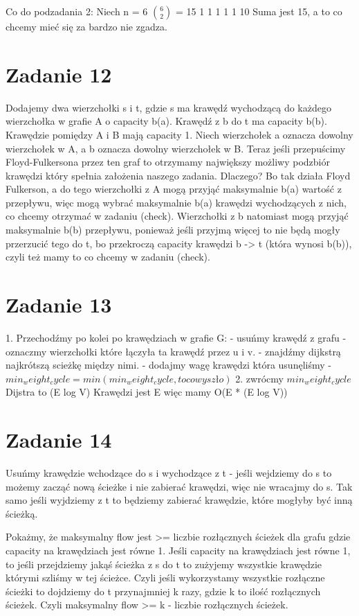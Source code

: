 \documentclass[12pt]{article}
\begin{document}
Co do podzadania 2:
Niech n = 6
$\binom{6}{2}$ = 15
1 1 1 1 1 10
Suma jest 15, a to co chcemy mieć się za bardzo nie zgadza.


\section{Zadanie 12} %
Dodajemy dwa wierzchołki s i t, gdzie s ma krawędź wychodzącą do każdego wierzchołka w grafie A o capacity b(a). Krawędź z b do t ma capacity b(b). 
Krawędzie pomiędzy A i B mają capacity 1.
Niech wierzchołek a oznacza dowolny wierzchołek w A, a b oznacza dowolny wierzchołek w B.
Teraz jeśli przepuścimy Floyd-Fulkersona przez ten graf to otrzymamy największy możliwy podzbiór krawędzi który spełnia założenia naszego zadania. Dlaczego? Bo tak działa Floyd Fulkerson, a do tego wierzchołki z A mogą przyjąć maksymalnie b(a) wartość z przepływu, więc mogą wybrać maksymalnie b(a) krawędzi wychodzących z nich, co chcemy otrzymać w zadaniu (check). Wierzchołki z b natomiast mogą przyjąć maksymalnie b(b) przepływu, ponieważ jeśli przyjmą więcej to nie będą mogły przerzucić tego do t, bo przekroczą capacity krawędzi b -> t (która wynosi b(b)), czyli też mamy to co chcemy w zadaniu (check).

\section{Zadanie 13} %
1. Przechodźmy po kolei po krawędziach w grafie G:
- usuńmy krawędź z grafu 
- oznaczmy wierzchołki które łączyła ta krawędź przez u i v.
- znajdźmy dijkstrą najkrótszą scieżkę między nimi. 
- dodajmy wagę krawędzi która usunęliśmy
- $min_weight_cycle = min(min_weight_cycle, to co wyszło)$
2. zwrócmy $min_weight_cycle$
Dijstra to (E log V)
Krawędzi jest E 
więc mamy O(E * (E log V))
\section{Zadanie 14} %
Usuńmy krawędzie wchodzące do s i wychodzące z t - jeśli wejdziemy do s to możemy zacząć nową ścieżke i nie zabierać krawędzi, więc nie wracajmy do s. Tak samo jeśli wyjdziemy z t to będziemy zabierać krawędzie, które mogłyby być inną ścieżką. 

Pokażmy, że maksymalny flow jest >= liczbie rozłącznych ścieżek dla grafu gdzie capacity na krawędziach jest równe 1. 
Jeśli capacity na krawędziach jest równe 1, to jeśli przejdziemy jakąś ścieżka z s do t to zużyjemy wszystkie krawędzie którymi szliśmy w tej ścieżce. Czyli jeśli wykorzystamy wszystkie rozłączne ścieżki to dojdziemy do t przynajmniej k razy, gdzie k to ilość rozłącznych ścieżek. Czyli maksymalny flow >= k - liczbie rozłącznych ścieżek.
\end{document}
